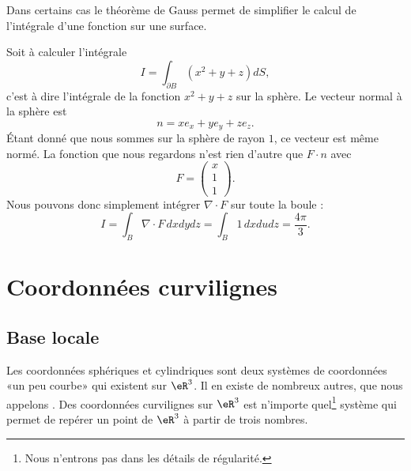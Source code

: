 Dans certains cas le théorème de Gauss permet de simplifier le calcul de l'intégrale d'une fonction sur une surface.

\begin{example}
    Soit à calculer l'intégrale
    \begin{equation}
        I=\int_{\partial B}(x^2+y+z)dS,
    \end{equation}
    c'est à dire l'intégrale de la fonction $x^2+y+z$ sur la sphère. Le vecteur normal à la sphère est
    \begin{equation}
        n=xe_x+ye_y+ze_z.
    \end{equation}
    Étant donné que nous sommes sur la sphère de rayon $1$, ce vecteur est même normé. La fonction que nous regardons n'est rien d'autre que $F\cdot n$ avec
    \begin{equation}
        F=\begin{pmatrix}
            x    \\ 
            1    \\ 
            1    
        \end{pmatrix}.
    \end{equation}
    Nous pouvons donc simplement intégrer $\nabla\cdot F$ sur toute la boule :
    \begin{equation}
        I=\int_{B}\nabla\cdot F\,dxdydz=\int_B 1\,dxdudz=\frac{ 4\pi }{ 3 }.
    \end{equation}
\end{example}

\section{Coordonnées curvilignes}

\subsection{Base locale}

Les coordonnées sphériques et cylindriques sont deux systèmes de coordonnées «un peu courbe» qui existent sur $\eR^3$. Il en existe de nombreux autres, que nous appelons . Des coordonnées curvilignes sur $\eR^3$ est n'importe quel\footnote{Nous n'entrons pas dans les détails de régularité.} système qui permet de repérer un point de $\eR^3$ à partir de trois nombres.


